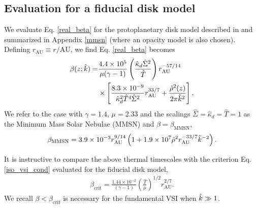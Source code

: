 \subsection{Evaluation for a fiducial disk model}
We evaluate Eq. \ref{real_beta} for the protoplanetary disk model
described in \cite{chiang10} and summarized in Appendix \ref{mmsn}
(where an opacity model is also chosen). Defining $r_\mathrm{AU}\equiv
r/\mathrm{AU}$, we find Eq. \ref{real_beta} becomes
\begin{align}\label{beta_mmsn}
  \beta(z; \hat{k}) =
  &\frac{4.4\times10^5}{\mu(\gamma-1)}\left(\frac{\hat{\kappa}_d\hat{\Sigma}^2}{\hat{T}}\right)r_\mathrm{AU}^{-57/14}\notag\\
&\times\left[\frac{8.3\times10^{-9}}{\hat{\kappa}_d^2\hat{T}^4\hat{\Sigma}^2}r_\mathrm{AU}^{33/7}+\frac{\hat{\rho}^2(z)}{2\pi\hat{k}^2}\right].       
\end{align} 
We refer to the case with $\gamma=1.4$, $\mu=2.33$ and the scalings
$\hat{\Sigma}=\hat{\kappa}_d=\hat{T}=1$ as the Minimum Mass Solar
Nebulae (MMSN) and $\beta=\beta_\mathrm{MMSN}$, 
\begin{align}\label{beta_mmsn_simp}
  \beta_\mathrm{MMSN} = 3.9\times10^{-3} r_\mathrm{AU}^{9/14}\left( 1 +
    1.9\times10^7\hat{\rho}^2r_\mathrm{AU}^{-33/7}\hat{k}^{-2}\right). 
\end{align}

It is instructive to compare the above thermal timescales
with the criterion Eq. \ref{iso_vsi_cond} evaluated for the fiducial disk model,    
\begin{align}\label{bcrit_mmsn}
  \beta_\mathrm{crit} = \frac{1.44\times10^{-2}}{(\gamma
    -1)}\left(\frac{\hat{T}}{\mu}\right)^{1/2}r_\mathrm{AU}^{2/7}. 
\end{align}
We recall $\beta < \beta_\mathrm{crit}$ is necessary for the
fundamental VSI when $\hat{k}\gg 1$. %

